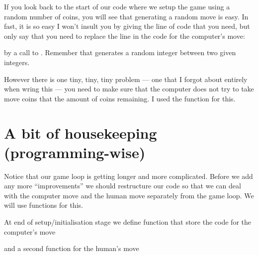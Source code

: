 \documentclass{coderdojo}
\begin{document}
If you look back to the start of our code where we setup the game using a random number of coins, you will see that generating a random move is easy. In fast, it is so easy I won't insult you by giving the line of code that you need, but only say that you need to replace the  line in the code for the computer's move:



\vspace{6pt}
by a call to .  Remember that   generates a random integer between two given integers.

However there is one tiny, tiny, tiny problem --- one that I forgot about entirely when wring this --- you need to make sure that the computer does not try to take move coins that the amount of coins remaining. I used the  function for this.

\clearpage

\section{A bit of housekeeping (programming-wise)}

\vspace{6pt}
Notice that our game loop is getting longer and more complicated.  Before we add any more ``improvements''  we should  restructure our code so that we can deal with the computer move and the human move separately from the game loop. We will use functions for this.

At end of setup/initialisation stage we define function that store the code for the computer's move



\vspace{6pt}
and a second function for the human's move

\end{document}
